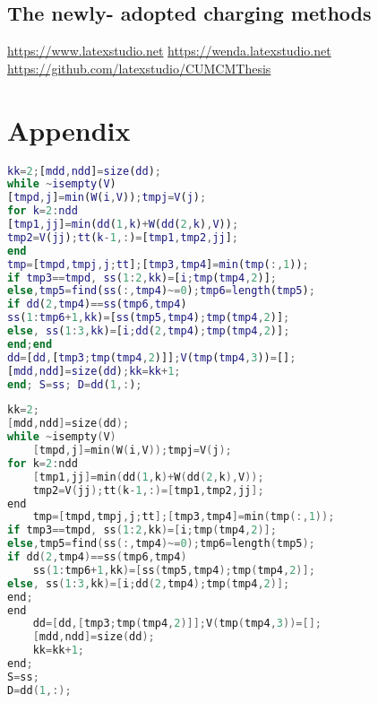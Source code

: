 \documentclass{tzmcmthesis}
\begin{document}
\subsection{The newly- adopted charging methods}


\begin{thebibliography}{9}%
  \url{https://www.latexstudio.net}
  \url{https://wenda.latexstudio.net}
   \url{https://github.com/latexstudio/CUMCMThesis}
\end{thebibliography}

\newpage

\section{Appendix}
\begin{lstlisting}[language=matlab,caption={The matlab Source code of Algorithm}]
kk=2;[mdd,ndd]=size(dd);
while ~isempty(V)
[tmpd,j]=min(W(i,V));tmpj=V(j);
for k=2:ndd
[tmp1,jj]=min(dd(1,k)+W(dd(2,k),V));
tmp2=V(jj);tt(k-1,:)=[tmp1,tmp2,jj];
end
tmp=[tmpd,tmpj,j;tt];[tmp3,tmp4]=min(tmp(:,1));
if tmp3==tmpd, ss(1:2,kk)=[i;tmp(tmp4,2)];
else,tmp5=find(ss(:,tmp4)~=0);tmp6=length(tmp5);
if dd(2,tmp4)==ss(tmp6,tmp4)
ss(1:tmp6+1,kk)=[ss(tmp5,tmp4);tmp(tmp4,2)];
else, ss(1:3,kk)=[i;dd(2,tmp4);tmp(tmp4,2)];
end;end
dd=[dd,[tmp3;tmp(tmp4,2)]];V(tmp(tmp4,3))=[];
[mdd,ndd]=size(dd);kk=kk+1;
end; S=ss; D=dd(1,:);
 \end{lstlisting}
\begin{lstlisting}[language=c,caption={The lingo source code}]
kk=2;
[mdd,ndd]=size(dd);
while ~isempty(V)
    [tmpd,j]=min(W(i,V));tmpj=V(j);
for k=2:ndd
    [tmp1,jj]=min(dd(1,k)+W(dd(2,k),V));
    tmp2=V(jj);tt(k-1,:)=[tmp1,tmp2,jj];
end
    tmp=[tmpd,tmpj,j;tt];[tmp3,tmp4]=min(tmp(:,1));
if tmp3==tmpd, ss(1:2,kk)=[i;tmp(tmp4,2)];
else,tmp5=find(ss(:,tmp4)~=0);tmp6=length(tmp5);
if dd(2,tmp4)==ss(tmp6,tmp4)
    ss(1:tmp6+1,kk)=[ss(tmp5,tmp4);tmp(tmp4,2)];
else, ss(1:3,kk)=[i;dd(2,tmp4);tmp(tmp4,2)];
end;
end
    dd=[dd,[tmp3;tmp(tmp4,2)]];V(tmp(tmp4,3))=[];
    [mdd,ndd]=size(dd);
    kk=kk+1;
end;
S=ss;
D=dd(1,:);
 \end{lstlisting}
\end{document}

